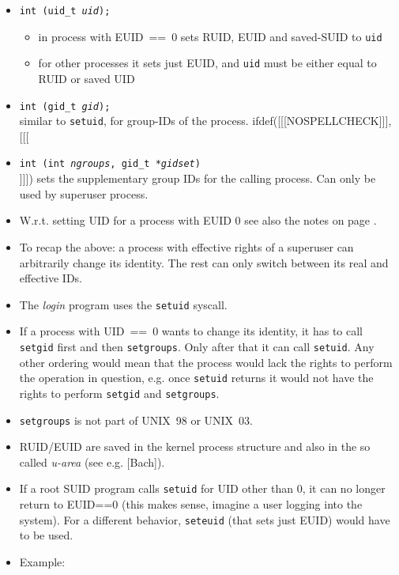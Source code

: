 \begin{slide}
\begin{itemize}
\item \texttt{int (uid\_t \emph{uid});}
    \begin{itemize}
    \item in process with EUID~==~0 sets RUID, EUID and saved-SUID to
    \texttt{uid}
    \item for other processes it sets just EUID, and \texttt{uid} must be
    either equal to RUID or saved UID
    \end{itemize}
\item \texttt{int (gid\_t \emph{gid});} \\
similar to \texttt{setuid}, for group-IDs of the process.
ifdef([[[NOSPELLCHECK]]], [[[
\item \texttt{int (int \emph{ngroups},
gid\_t *\emph{gidset})} \\
]]])
sets the supplementary group IDs for the calling process. Can only be used
by superuser process.
\end{itemize}
\end{slide}

\begin{itemize}
\item W.r.t. setting UID for a process with EUID 0 see also the notes on page
\pageref{ROOT_SETUID}.
\item To recap the above: a process with effective rights of a superuser can
arbitrarily change its identity. The rest can only switch between its real and
effective IDs.
\item The \emph{login} program uses the \texttt{setuid} syscall.
\item If a process with UID~==~0 wants to change its identity, it has to call
\texttt{setgid} first and then \texttt{setgroups}. Only after that it can call
\texttt{setuid}. Any other ordering would mean that the process would lack the
rights to perform the operation in question, e.g. once \texttt{setuid} returns
it would not have the rights to perform \texttt{setgid} and \texttt{setgroups}.
\item \texttt{setgroups} is not part of UNIX~98 or UNIX~03.
\item RUID/EUID are saved in the kernel process structure and also in the so
called \emph{u-area} (see e.g. [Bach]).
\item If a root SUID program calls \texttt{setuid} for UID other than 0, it can
no longer return to EUID==0 (this makes sense, imagine a user logging into the
system). For a different behavior, \texttt{seteuid} (that sets just EUID) would
have to be used.
\item Example: 
\end{itemize}

